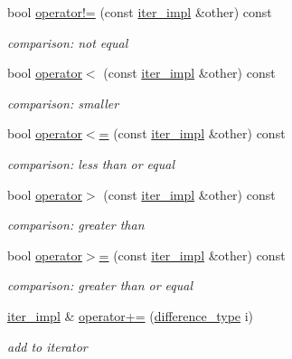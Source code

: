 \begin{DoxyCompactItemize}
bool \hyperlink{classnlohmann_1_1basic__json_1_1iter__impl_a6708f3c0ac4111be7bb66895b8049997}{operator!=} (const \hyperlink{classnlohmann_1_1basic__json_1_1iter__impl}{iter\+\_\+impl} \&other) const 
\begin{DoxyCompactList}\small\item\em comparison\+: not equal \end{DoxyCompactList}\item 
bool \hyperlink{classnlohmann_1_1basic__json_1_1iter__impl_a1c96a1d7da420c5eb8bd23c69eb49ec5}{operator$<$} (const \hyperlink{classnlohmann_1_1basic__json_1_1iter__impl}{iter\+\_\+impl} \&other) const 
\begin{DoxyCompactList}\small\item\em comparison\+: smaller \end{DoxyCompactList}\item 
bool \hyperlink{classnlohmann_1_1basic__json_1_1iter__impl_a0c060e6fd942cd488a2aaf55893dac97}{operator$<$=} (const \hyperlink{classnlohmann_1_1basic__json_1_1iter__impl}{iter\+\_\+impl} \&other) const 
\begin{DoxyCompactList}\small\item\em comparison\+: less than or equal \end{DoxyCompactList}\item 
bool \hyperlink{classnlohmann_1_1basic__json_1_1iter__impl_ad2a8ac7f35df197556a07b5bb911686a}{operator$>$} (const \hyperlink{classnlohmann_1_1basic__json_1_1iter__impl}{iter\+\_\+impl} \&other) const 
\begin{DoxyCompactList}\small\item\em comparison\+: greater than \end{DoxyCompactList}\item 
bool \hyperlink{classnlohmann_1_1basic__json_1_1iter__impl_a67308ff9b12231ba979140fac1c4f167}{operator$>$=} (const \hyperlink{classnlohmann_1_1basic__json_1_1iter__impl}{iter\+\_\+impl} \&other) const 
\begin{DoxyCompactList}\small\item\em comparison\+: greater than or equal \end{DoxyCompactList}\item 
\hyperlink{classnlohmann_1_1basic__json_1_1iter__impl}{iter\+\_\+impl} \& \hyperlink{classnlohmann_1_1basic__json_1_1iter__impl_a3c33bcab07e7022bb93e2a91277a3402}{operator+=} (\hyperlink{classnlohmann_1_1basic__json_1_1iter__impl_a088519ca37ae2be2c1f1bbc4868dc878}{difference\+\_\+type} i)
\begin{DoxyCompactList}\small\item\em add to iterator \end{DoxyCompactList}\item 

\end{DoxyCompactItemize}
